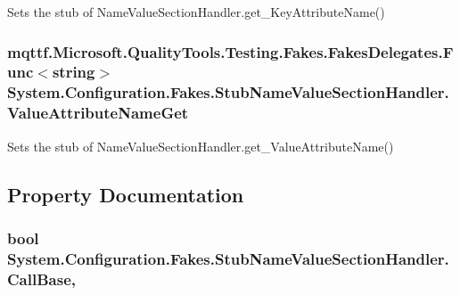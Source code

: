 Sets the stub of Name\-Value\-Section\-Handler.\-get\-\_\-\-Key\-Attribute\-Name()

\hypertarget{class_system_1_1_configuration_1_1_fakes_1_1_stub_name_value_section_handler_acf80fdc2b6222a4dd1943a22a470782f}{
\subsubsection[{Value\-Attribute\-Name\-Get}]{\setlength{\rightskip}{0pt plus 5cm}mqttf.\-Microsoft.\-Quality\-Tools.\-Testing.\-Fakes.\-Fakes\-Delegates.\-Func$<$string$>$ System.\-Configuration.\-Fakes.\-Stub\-Name\-Value\-Section\-Handler.\-Value\-Attribute\-Name\-Get}}\label{class_system_1_1_configuration_1_1_fakes_1_1_stub_name_value_section_handler_acf80fdc2b6222a4dd1943a22a470782f}


Sets the stub of Name\-Value\-Section\-Handler.\-get\-\_\-\-Value\-Attribute\-Name()



\subsection{Property Documentation}
\hypertarget{class_system_1_1_configuration_1_1_fakes_1_1_stub_name_value_section_handler_a21e2f81b2857d932bdda86f9394a640c}{
\subsubsection[{Call\-Base}]{\setlength{\rightskip}{0pt plus 5cm}bool System.\-Configuration.\-Fakes.\-Stub\-Name\-Value\-Section\-Handler.\-Call\-Base\hspace{0.3cm}{\ttfamily [get]}, {\ttfamily [set]}}}\label{class_system_1_1_configuration_1_1_fakes_1_1_stub_name_value_section_handler_a21e2f81b2857d932bdda86f9394a640c}


